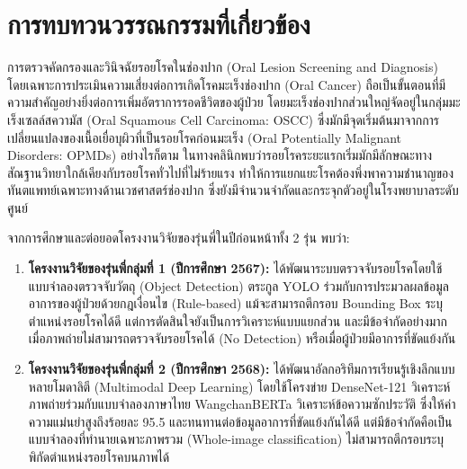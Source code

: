 
\chapter{การทบทวนวรรณกรรมที่เกี่ยวข้อง}
\label{chapter:literature-review}

การตรวจคัดกรองและวินิจฉัยรอยโรคในช่องปาก (Oral Lesion Screening and Diagnosis) โดยเฉพาะการประเมินความเสี่ยงต่อการเกิดโรคมะเร็งช่องปาก (Oral Cancer) ถือเป็นขั้นตอนที่มีความสำคัญอย่างยิ่งต่อการเพิ่มอัตราการรอดชีวิตของผู้ป่วย โดยมะเร็งช่องปากส่วนใหญ่จัดอยู่ในกลุ่มมะเร็งเซลล์สความัส (Oral Squamous Cell Carcinoma: OSCC) ซึ่งมักมีจุดเริ่มต้นมาจากการเปลี่ยนแปลงของเนื้อเยื่อบุผิวที่เป็นรอยโรคก่อนมะเร็ง (Oral Potentially Malignant Disorders: OPMDs) อย่างไรก็ตาม ในทางคลินิกพบว่ารอยโรคระยะแรกเริ่มมักมีลักษณะทางสัณฐานวิทยาใกล้เคียงกับรอยโรคทั่วไปที่ไม่ร้ายแรง ทำให้การแยกแยะโรคต้องพึ่งพาความชำนาญของทันตแพทย์เฉพาะทางด้านเวชศาสตร์ช่องปาก ซึ่งยังมีจำนวนจำกัดและกระจุกตัวอยู่ในโรงพยาบาลระดับศูนย์

จากการศึกษาและต่อยอดโครงงานวิจัยของรุ่นพี่ในปีก่อนหน้าทั้ง 2 รุ่น พบว่า:
\begin{enumerate}
    \item \textbf{โครงงานวิจัยของรุ่นพี่กลุ่มที่ 1 (ปีการศึกษา 2567):} ได้พัฒนาระบบตรวจจับรอยโรคโดยใช้แบบจำลองตรวจจับวัตถุ (Object Detection) ตระกูล YOLO ร่วมกับการประมวลผลข้อมูลอาการของผู้ป่วยด้วยกฎเงื่อนไข (Rule-based) แม้จะสามารถตีกรอบ Bounding Box ระบุตำแหน่งรอยโรคได้ดี แต่การตัดสินใจยังเป็นการวิเคราะห์แบบแยกส่วน และมีข้อจำกัดอย่างมากเมื่อภาพถ่ายไม่สามารถตรวจจับรอยโรคได้ (No Detection) หรือเมื่อผู้ป่วยมีอาการที่ขัดแย้งกัน
    \item \textbf{โครงงานวิจัยของรุ่นพี่กลุ่มที่ 2 (ปีการศึกษา 2568):} ได้พัฒนาอัลกอริทึมการเรียนรู้เชิงลึกแบบหลายโมดาลิตี (Multimodal Deep Learning) โดยใช้โครงข่าย DenseNet-121 วิเคราะห์ภาพถ่ายร่วมกับแบบจำลองภาษาไทย WangchanBERTa วิเคราะห์ข้อความซักประวัติ ซึ่งให้ค่าความแม่นยำสูงถึงร้อยละ 95.5 และทนทานต่อข้อมูลอาการที่ขัดแย้งกันได้ดี แต่มีข้อจำกัดคือเป็นแบบจำลองที่ทำนายเฉพาะภาพรวม (Whole-image classification) ไม่สามารถตีกรอบระบุพิกัดตำแหน่งรอยโรคบนภาพได้
\end{enumerate}

